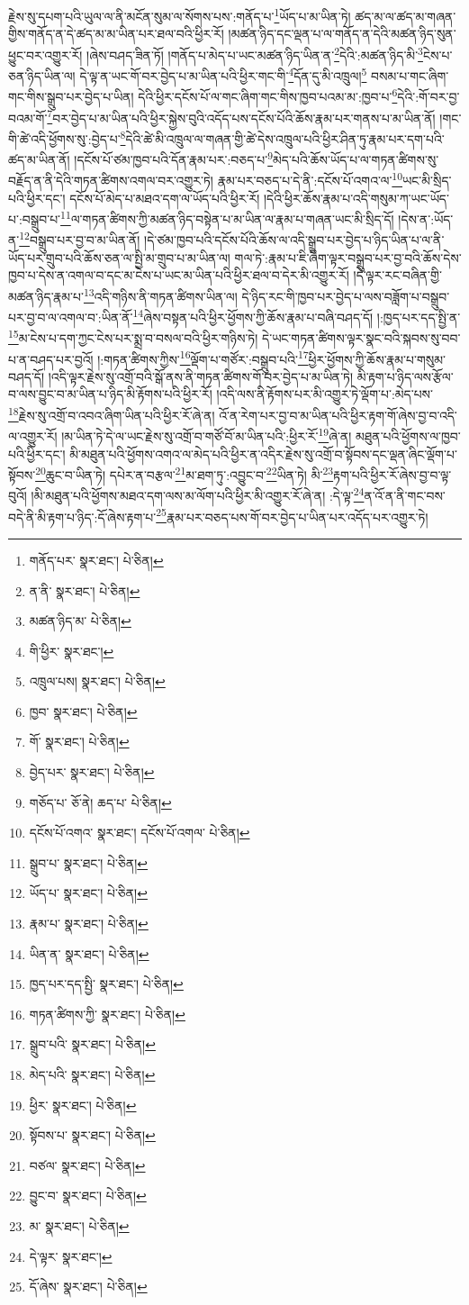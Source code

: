 རྗེས་སུ་དཔག་པའི་ཡུལ་ལ་ནི་མངོན་སུམ་ལ་སོགས་པས་:གནོད་པ་\footnote{གནོད་པར་  སྣར་ཐང་།  པེ་ཅིན། }ཡོད་པ་མ་ཡིན་ཏེ། ཚད་མ་ལ་ཚད་མ་གཞན་གྱིས་གནོད་ན་དེ་ཚད་མ་མ་ཡིན་པར་ཐལ་བའི་ཕྱིར་རོ། །མཚན་ཉིད་དང་ལྡན་པ་ལ་གནོད་ན་དེའི་མཚན་ཉིད་སུན་ཕྱུང་བར་འགྱུར་རོ། །ཞེས་བཤད་ཟིན་ཏོ། །གནོད་པ་མེད་པ་ཡང་མཚན་ཉིད་ཡིན་ན་\footnote{ན་ནི་  སྣར་ཐང་།  པེ་ཅིན། }དེའི་:མཚན་ཉིད་མི་\footnote{མཚན་ཉིད་མ་  པེ་ཅིན། }ངེས་པ་ཅན་ཉིད་ཡིན་ལ། དེ་ལྟ་ན་ཡང་གོ་བར་བྱེད་པ་མ་ཡིན་པའི་ཕྱིར་གང་གི་\footnote{གི་ཕྱིར་  སྣར་ཐང་། }དོན་དུ་མི་འཁྲུལ།\footnote{འཁྲུལ་པས།  སྣར་ཐང་།  པེ་ཅིན། } བསམ་པ་གང་ཞིག་གང་གིས་སྒྲུབ་པར་བྱེད་པ་ཡིན། དེའི་ཕྱིར་དངོས་པོ་ལ་གང་ཞིག་གང་གིས་ཁྱབ་པའམ་མ་:ཁྱབ་པ་\footnote{ཁྱབ་  སྣར་ཐང་།  པེ་ཅིན། }དེའི་:གོ་བར་བྱ་བའམ་གོ་\footnote{གོ་  སྣར་ཐང་།  པེ་ཅིན། }བར་བྱེད་པ་མ་ཡིན་པའི་ཕྱིར་སྐྱེས་བུའི་འདོད་པས་དངོས་པོའི་ཆོས་རྣམ་པར་གནས་པ་མ་ཡིན་ནོ། །གང་གི་ཚེ་འདི་ཕྱོགས་སུ་:བྱེད་པ་\footnote{བྱེད་པར་  སྣར་ཐང་།  པེ་ཅིན། }དེའི་ཚེ་མི་འཁྲུལ་ལ་གཞན་གྱི་ཚེ་དེས་འཁྲུལ་པའི་ཕྱིར་ཤིན་ཏུ་རྣམ་པར་དག་པའི་ཚད་མ་ཡིན་ནོ། །དངོས་པོ་ཙམ་ཁྱབ་པའི་དོན་རྣམ་པར་:བཅད་པ་\footnote{གཅོད་པ་  ཅོ་ནེ། ཆད་པ་  པེ་ཅིན། }མེད་པའི་ཆོས་ཡོད་པ་ལ་གཏན་ཚིགས་སུ་བརྗོད་ན་ནི་དེའི་གཏན་ཚིགས་འགལ་བར་འགྱུར་ཏེ། རྣམ་པར་བཅད་པ་དེ་ནི་:དངོས་པོ་འགའ་ལ་\footnote{དངོས་པོ་འགའ་  སྣར་ཐང་། དངོས་པོ་འགལ་  པེ་ཅིན། }ཡང་མི་སྲིད་པའི་ཕྱིར་དང་། དངོས་པོ་མེད་པ་མཐའ་དག་ལ་ཡོད་པའི་ཕྱིར་རོ། །དེའི་ཕྱིར་ཆོས་རྣམ་པ་འདི་གསུམ་ཀ་ཡང་ཡོད་པ་:བསྒྲུབ་པ་\footnote{སྒྲུབ་པ་  སྣར་ཐང་།  པེ་ཅིན། }ལ་གཏན་ཚིགས་ཀྱི་མཚན་ཉིད་བསྟེན་པ་མ་ཡིན་ལ་རྣམ་པ་གཞན་ཡང་མི་སྲིད་དོ། །དེས་ན་:ཡོད་ན་\footnote{ཡོད་པ་  སྣར་ཐང་།  པེ་ཅིན། }བསྒྲུབ་པར་བྱ་བ་མ་ཡིན་ནོ། །དེ་ཙམ་ཁྱབ་པའི་དངོས་པོའི་ཆོས་ལ་འདི་སྒྲུབ་པར་བྱེད་པ་ཉིད་ཡིན་པ་ལ་ནི་ཡོད་པར་གྲུབ་པའི་ཆོས་ཅན་ལ་སྤྱི་མ་གྲུབ་པ་མ་ཡིན་ལ། གལ་ཏེ་:རྣམ་པ་ཇི་ཞིག་ལྟར་བསྒྲུབ་པར་བྱ་བའི་ཆོས་དེས་ཁྱབ་པ་དེས་ན་འགལ་བ་དང་མ་ངེས་པ་ཡང་མ་ཡིན་པའི་ཕྱིར་ཐལ་བ་དེར་མི་འགྱུར་རོ། །དེ་ལྟར་རང་བཞིན་གྱི་མཚན་ཉིད་རྣམ་པ་\footnote{རྣམ་པ་  སྣར་ཐང་།  པེ་ཅིན། }འདི་གཉིས་ནི་གཏན་ཚིགས་ཡིན་ལ། དེ་ཉིད་རང་གི་ཁྱབ་པར་བྱེད་པ་ལས་བཟློག་པ་བསྒྲུབ་པར་བྱ་བ་ལ་འགལ་བ་:ཡིན་ནོ་\footnote{ཡིན་ན་  སྣར་ཐང་།  པེ་ཅིན། }ཞེས་བསྟན་པའི་ཕྱིར་ཕྱོགས་ཀྱི་ཆོས་རྣམ་པ་བཞི་བཤད་དོ། །:ཁྱད་པར་དད་སྤྱི་ན་\footnote{ཁྱད་པར་དད་སྤྱི་  སྣར་ཐང་།  པེ་ཅིན། }མ་ངེས་པ་དག་ཀྱང་ངེས་པར་སྨྲ་བ་བསལ་བའི་ཕྱིར་གཉིས་ཏེ། དེ་ཡང་གཏན་ཚིགས་ལྟར་སྣང་བའི་སྐབས་སུ་བབ་པ་ན་བཤད་པར་བྱའོ། །:གཏན་ཚིགས་ཀྱིས་\footnote{གཏན་ཚིགས་ཀྱི་  སྣར་ཐང་།  པེ་ཅིན། }ལྡོག་པ་གཙོར་:བསྒྲུབ་པའི་\footnote{སྒྲུབ་པའི་  སྣར་ཐང་།  པེ་ཅིན། }ཕྱིར་ཕྱོགས་ཀྱི་ཆོས་རྣམ་པ་གསུམ་བཤད་དོ། །འདི་ལྟར་རྗེས་སུ་འགྲོ་བའི་སྒོ་ནས་ནི་གཏན་ཚིགས་གོ་བར་བྱེད་པ་མ་ཡིན་ཏེ། མི་རྟག་པ་ཉིད་ལས་རྩོལ་བ་ལས་བྱུང་བ་མ་ཡིན་པ་ཉིད་མི་རྟོགས་པའི་ཕྱིར་རོ། །འདི་ལས་ནི་རྟོགས་པར་མི་འགྱུར་ཏེ་ལྡོག་པ་:མེད་པས་\footnote{མེད་པའི་  སྣར་ཐང་།  པེ་ཅིན། }རྗེས་སུ་འགྲོ་བ་འབའ་ཞིག་ཡིན་པའི་ཕྱིར་རོ་ཞེ་ན། འོ་ན་རེག་པར་བྱ་བ་མ་ཡིན་པའི་ཕྱིར་རྟག་གོ་ཞེས་བྱ་བ་འདི་ལ་འགྱུར་རོ། །མ་ཡིན་ཏེ་དེ་ལ་ཡང་རྗེས་སུ་འགྲོ་བ་གཙོ་བོ་མ་ཡིན་པའི་:ཕྱིར་རོ་\footnote{ཕྱིར་  སྣར་ཐང་།  པེ་ཅིན། }ཞེ་ན། མཐུན་པའི་ཕྱོགས་ལ་ཁྱབ་པའི་ཕྱིར་དང་། མི་མཐུན་པའི་ཕྱོགས་འགའ་ལ་མེད་པའི་ཕྱིར་ན་འདིར་རྗེས་སུ་འགྲོ་བ་སྟོབས་དང་ལྡན་ཞིང་ལྡོག་པ་སྟོབས་\footnote{སྟོབས་པ་  སྣར་ཐང་།  པེ་ཅིན། }ཆུང་བ་ཡིན་ཏེ། དཔེར་ན་བརྩལ་\footnote{བཙལ་  སྣར་ཐང་།  པེ་ཅིན། }མ་ཐག་ཏུ་:འབྱུང་བ་\footnote{བྱུང་བ་  སྣར་ཐང་།  པེ་ཅིན། }ཡིན་ཏེ། མི་\footnote{མ་  སྣར་ཐང་།  པེ་ཅིན། }རྟག་པའི་ཕྱིར་རོ་ཞེས་བྱ་བ་ལྟ་བུའོ། །མི་མཐུན་པའི་ཕྱོགས་མཐའ་དག་ལས་མ་ལོག་པའི་ཕྱིར་མི་འགྱུར་རོ་ཞེ་ན། :དེ་ལྟ་\footnote{དེ་ལྟར་  སྣར་ཐང་། }ན་འོ་ན་ནི་གང་བས་བདེ་ནི་མི་རྟག་པ་ཉིད་:དོ་ཞེས་རྟག་པ་\footnote{དོ་ཞེས་  སྣར་ཐང་།  པེ་ཅིན། }རྣམ་པར་བཅད་པས་གོ་བར་བྱེད་པ་ཡིན་པར་འདོད་པར་འགྱུར་ཏེ། 